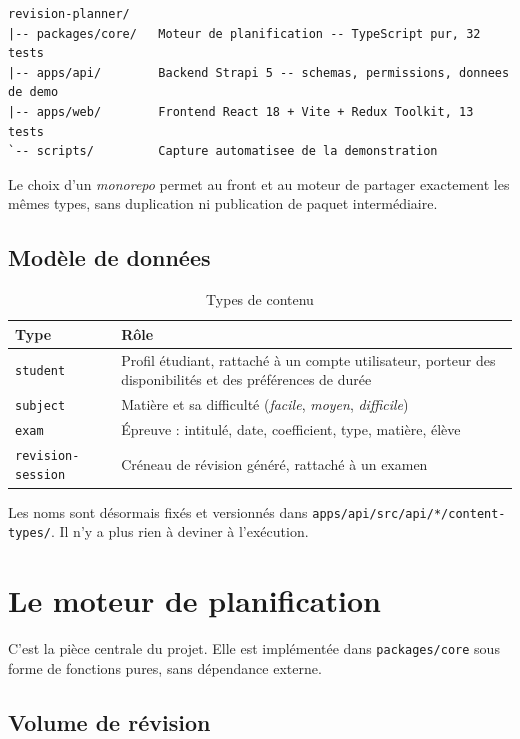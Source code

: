 \documentclass[11pt,a4paper]{report}
\begin{document}
\begin{lstlisting}[caption={Organisation du dépôt}]
revision-planner/
|-- packages/core/   Moteur de planification -- TypeScript pur, 32 tests
|-- apps/api/        Backend Strapi 5 -- schemas, permissions, donnees de demo
|-- apps/web/        Frontend React 18 + Vite + Redux Toolkit, 13 tests
`-- scripts/         Capture automatisee de la demonstration
\end{lstlisting}

Le choix d'un \emph{monorepo} permet au front et au moteur de partager exactement
les mêmes types, sans duplication ni publication de paquet intermédiaire.

\section{Modèle de données}

\begin{table}[h]
\centering
\begin{tabular}{@{}lp{9.5cm}@{}}
\toprule
\textbf{Type} & \textbf{Rôle} \\
\midrule
\texttt{student} & Profil étudiant, rattaché à un compte utilisateur, porteur des disponibilités et des préférences de durée \\
\texttt{subject} & Matière et sa difficulté (\emph{facile}, \emph{moyen}, \emph{difficile}) \\
\texttt{exam}    & Épreuve : intitulé, date, coefficient, type, matière, élève \\
\texttt{revision-session} & Créneau de révision généré, rattaché à un examen \\
\bottomrule
\end{tabular}
\caption{Types de contenu}
\end{table}

Les noms sont désormais fixés et versionnés dans \texttt{apps/api/src/api/*/con\-tent-types/}.
Il n'y a plus rien à deviner à l'exécution.

\chapter{Le moteur de planification}

C'est la pièce centrale du projet. Elle est implémentée dans
\texttt{packages/core} sous forme de fonctions pures, sans dépendance externe.

\section{Volume de révision}
\end{document}
